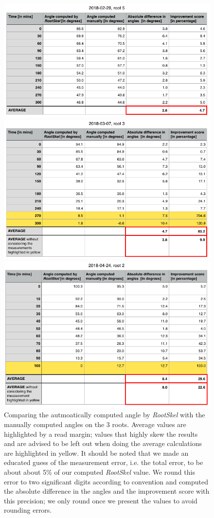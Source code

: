 \begin{figure}[h!]
	
	\centering
	
	\includegraphics[width=.7\textwidth]{../Figures/2018-02-28-stats.png}
	
	\includegraphics[width=.7\textwidth]{../Figures/2018-03-07-stats.png}
	
	\includegraphics[width=.7\textwidth]{../Figures/2018-04-24-stats.png}
	
	\caption{Comparing the autmoatically computed angle by \textit{RootSkel} with the manually computed angles on the 3 roots. Average values are highlighted by a read margin; values that highly skew the results and are advised to be left out when doing the average calculations are highlighted in yellow. 
		It should be noted that we made an educated guess of the measurement error, i.e. the total error, to be about about 5\% of our computed \textit{RootSkel} value. We round this error to two significant digits according to convention and computed the absolute difference in the angles and the improvement score with this precision; we only round once we present the values to avoid rounding errors. }
	
\end{figure}





